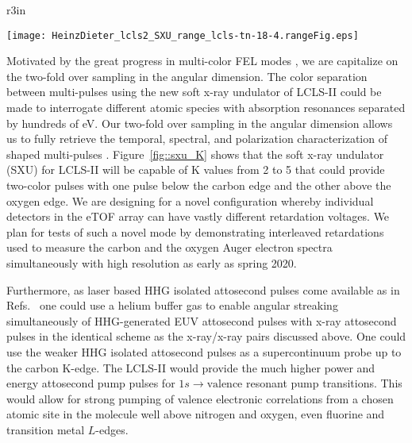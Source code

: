 \begin{wrapfigure}[15]{r}{3in}
\vspace{-1\baselineskip}
\centerline{
	\texttt{[image: HeinzDieter\_lcls2\_SXU\_range\_lcls-tn-18-4.rangeFig.eps]}
	}
\vspace{-1\baselineskip}
\caption{\label{fig::sxu_K} Soft x-ray undulator tuning range. \cite{HeinzDieter_SXU_twocolor}
	}
\end{wrapfigure}
Motivated by the great progress in multi-color FEL modes \cite{Lutman13_twocolor,Marinelli13_twocolor,Allaria2014,Marinelli2015,Prince2016,Lutman2016,Marinelli2016,Lutman2016FreshSlice}, we are capitalize on the two-fold over sampling in the angular dimension.
The color separation between multi-pulses using the new soft x-ray undulator of LCLS-II could be made to interrogate different atomic species with absorption resonances separated by hundreds of eV.
Our two-fold over sampling in the angular dimension allows us to fully retrieve the temporal, spectral, and polarization characterization of shaped multi-pulses \cite{Lutman2016,Lutman2016FreshSlice}.
Figure~\ref{fig::sxu_K} shows that the soft x-ray undulator (SXU) for LCLS-II will be capable of K values from 2 to 5 that could provide two-color pulses with one pulse below the carbon edge and the other above the oxygen edge.
We are designing for a novel configuration whereby individual detectors in the eTOF array can have vastly different retardation voltages.
We plan for tests of such a novel mode by demonstrating interleaved retardations used to measure the carbon and the oxygen Auger electron spectra simultaneously with high resolution as early as spring 2020.

Furthermore, as laser based HHG isolated attosecond pulses come available as in Refs.~\cite{Chen2014,Schmidt2016,Biegert2016,WornerSci2017} one could use a helium buffer gas to enable angular streaking simultaneously of HHG-generated EUV attosecond pulses with x-ray attosecond pulses in the identical scheme as the x-ray/x-ray pairs discussed above.
One could use the weaker HHG isolated attosecond pulses \cite{Biegert2016} as a supercontinuum probe up to the carbon K-edge.
The LCLS-II would provide the much higher power and energy attosecond pump pulses for $1s\rightarrow\mbox{valence}$ resonant pump transitions.
This would allow for strong pumping of valence electronic correlations from a chosen atomic site in the molecule well above nitrogen and oxygen, even fluorine and transition metal $L$-edges.

